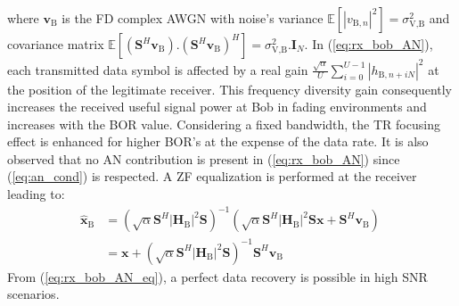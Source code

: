 \documentclass[journal,comsoc]{IEEEtran}
\newcommand{\module}[1]{\left|#1\right|}
\newcommand{\EX}[1]{\mathbb{E} \left[#1\right]}%
\newcommand{\HB}{\textbf{H}_{\text{B}}}
\newcommand{\spread}{\textbf{S}}
\begin{document}
where $\textbf{v}_\text{B}$ is the FD complex AWGN with noise's variance $\EX{|v_{\text{B},n}|^2}  = \sigma_{\text{V,B}}^2$ and covariance matrix $\EX{(\spread^H  \textbf{v}_\text{B}) . (\spread^H \textbf{v}_\text{B})^H} = \sigma_{\text{V,B}}^2 . \textbf{I}_N$. In (\ref{eq:rx_bob_AN}), each transmitted data symbol is affected by a real gain $ \frac{\sqrt{\alpha}}{U}\sum_{i=0}^{U-1} \left| h_{\text{B}, n + iN}\right|^2$ at the position of the legitimate receiver. This frequency diversity gain consequently increases the received useful signal power at Bob in fading environments and increases with the BOR value. Considering a fixed bandwidth, the TR focusing effect is enhanced for higher BOR's at the expense of the data rate. It is also observed that no AN contribution is present in (\ref{eq:rx_bob_AN}) since (\ref{eq:an_cond}) is respected. A ZF equalization is performed at the receiver leading to:
\begin{equation}
	\begin{split}
		\hat{\textbf{x}}_{\text{B}} &= \left( \sqrt{\alpha} \spread^H \module{\HB}^2 \spread \right)^{-1}  \left(\sqrt{\alpha}  \spread^H\module{\HB}^2 \spread \textbf{x}   +    \spread^H \textbf{v}_\text{B}\right) \\
		&= \textbf{x} + \left( \sqrt{\alpha} \spread^H \module{\HB}^2 \spread \right)^{-1} \spread^H \textbf{v}_\text{B}
	\end{split}
	\
	\label{eq:rx_bob_AN_eq}
\end{equation}
From (\ref{eq:rx_bob_AN_eq}), a perfect data recovery is possible in high SNR scenarios.



%
\end{document}
